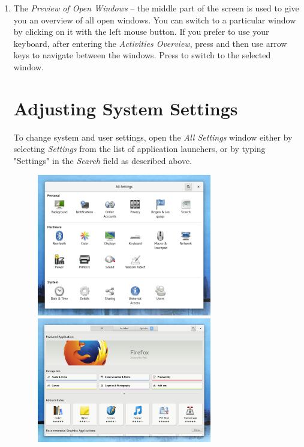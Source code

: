 \begin{enumerate}
\item The \emph{Preview of Open Windows} -- the middle part of the screen is used to give you an overview of all open windows. You can switch to a particular window by clicking on it with the left mouse button. If you prefer to use your keyboard, after entering the \emph{Activities Overview}, press  and then use arrow keys to navigate between the windows. Press  to switch to the selected window.

\section*{Adjusting System Settings}

To change system and user settings, open the \emph{All Settings} window either by selecting \emph{Settings} from the list of application launchers, or by typing "Settings" in the \emph{Search} field as described above.


\begin{figure}[p]
\begin{center}
\includegraphics[width=0.72\textwidth]{img/settings}
 \label{fig:settings}
\bigskip
\includegraphics[width=0.72\textwidth]{img/software}
 \label{fig:software}
\end{center}
\end{figure}


\end{enumerate}
